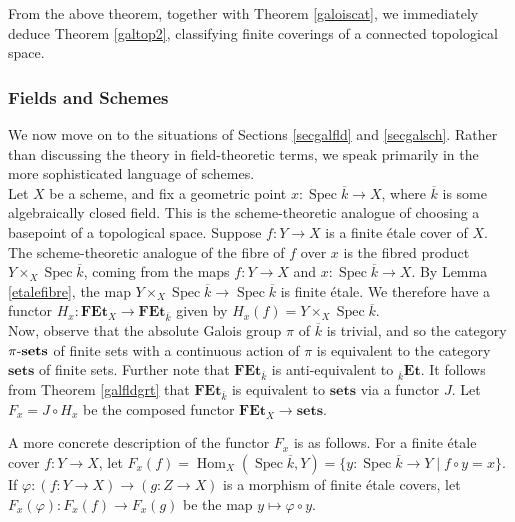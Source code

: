 \documentclass[11pt,openany]{book} %
\newcommand{\spc}{\operatorname{Spec}}
\newcommand{\xsets}[1]{#1\textnormal{-}\mathbf{sets}}
\begin{document}
From the above theorem, together with Theorem \ref{galoiscat}, we immediately deduce Theorem \ref{galtop2}, classifying finite coverings of a connected topological space.\\

\subsubsection{Fields and Schemes}

We now move on to the situations of Sections \ref{secgalfld} and \ref{secgalsch}. Rather than discussing the theory in field-theoretic terms, we speak primarily in the more sophisticated language of schemes.\\

Let $X$ be a scheme, and fix a geometric point $x : \spc \overline{k} \to X$, where $\overline{k}$ is some algebraically closed field. This is the scheme-theoretic analogue of choosing a basepoint of a topological space. Suppose $f: Y \to X$ is a finite \'etale cover of $X$. The scheme-theoretic analogue of the fibre of $f$ over $x$ is the fibred product $Y \times_X \spc \overline{k}$, coming from the maps $f : Y \to X$ and $x : \spc \overline{k} \to X$. By Lemma \ref{etalefibre}, the map $Y \times_X \spc \overline{k} \to \spc \overline{k}$ is finite \'etale. We therefore have a functor $H_x : \mathbf{FEt}_X \to \mathbf{FEt}_{\overline{k}}$ given by $H_x(f) = Y \times_X \spc \overline{k}$.\\

Now, observe that the absolute Galois group $\pi$ of $\overline{k}$ is trivial, and so the category $\xsets{\pi}$ of finite sets with a continuous action of $\pi$ is equivalent to the category $\mathbf{sets}$ of finite sets. Further note that $\mathbf{FEt}_{\overline{k}}$ is anti-equivalent to $_{\overline{k}}\mathbf{Et}$. It follows from Theorem \ref{galfldgrt} that $\mathbf{FEt}_{\overline{k}}$ is equivalent to $\mathbf{sets}$ via a functor $J$. Let $F_x = J \circ H_x$ be the composed functor $\mathbf{FEt}_X \to \mathbf{sets}$.

\begin{remark}
A more concrete description of the functor $F_x$ is as follows. For a finite \'etale cover $f : Y \to X$, let $F_x(f) = \operatorname{Hom}_X(\spc \overline{k},Y) = \{y : \spc \overline{k} \to Y \mid f \circ y = x\}$. If $\varphi : (f : Y \to X) \to (g : Z \to X)$ is a morphism of finite \'etale covers, let $F_x(\varphi) : F_x(f) \to F_x(g)$ be the map $y \mapsto \varphi \circ y$.
\end{remark}
\end{document}
